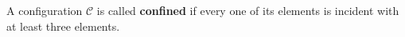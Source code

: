A configuration $\mathcal{C}$ is called \textbf{confined} if every one of its elements is incident with at least three elements.
